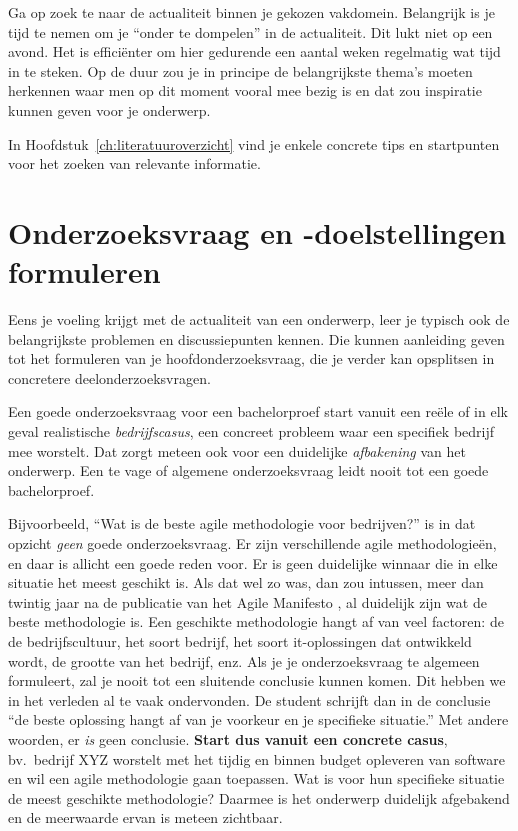 Ga op zoek te naar de actualiteit binnen je gekozen vakdomein. Belangrijk is je tijd te nemen om je ``onder te dompelen'' in de actualiteit. Dit lukt niet op een avond. Het is efficiënter om hier gedurende een aantal weken regelmatig wat tijd in te steken. Op de duur zou je in principe de belangrijkste thema's moeten herkennen waar men op dit moment vooral mee bezig is en dat zou inspiratie kunnen geven voor je onderwerp.

In Hoofdstuk~\ref{ch:literatuuroverzicht} vind je enkele concrete tips en startpunten voor het zoeken van relevante informatie.

\section{Onderzoeksvraag en -doelstellingen formuleren}%
\label{sec:onderzoeksvraag_formuleren}

Eens je voeling krijgt met de actualiteit van een onderwerp, leer je typisch ook de belangrijkste problemen en discussiepunten kennen. Die kunnen aanleiding geven tot het formuleren van je hoofdonderzoeksvraag, die je verder kan opsplitsen in concretere deelonderzoeksvragen.

Een goede onderzoeksvraag voor een bachelorproef start vanuit een reële of in elk geval realistische \textit{bedrijfscasus}, een concreet probleem waar een specifiek bedrijf mee worstelt. Dat zorgt meteen ook voor een duidelijke \textit{afbakening} van het onderwerp. Een te vage of algemene onderzoeksvraag leidt nooit tot een goede bachelorproef.

Bijvoorbeeld, ``Wat is de beste agile methodologie voor bedrijven?'' is in dat opzicht \textit{geen} goede onderzoeksvraag. Er zijn verschillende agile methodologieën, en daar is allicht een goede reden voor. Er is geen duidelijke winnaar die in elke situatie het meest geschikt is. Als dat wel zo was, dan zou intussen, meer dan twintig jaar na de publicatie van het Agile Manifesto \autocite{Beck2001}, al duidelijk zijn wat de beste methodologie is. Een geschikte methodologie hangt af van veel factoren: de de bedrijfscultuur, het soort bedrijf, het soort it-oplossingen dat ontwikkeld wordt, de grootte van het bedrijf, enz. Als je je onderzoeksvraag te algemeen formuleert, zal je nooit tot een sluitende conclusie kunnen komen. Dit hebben we in het verleden al te vaak ondervonden. De student schrijft dan in de conclusie ``de beste oplossing hangt af van je voorkeur en je specifieke situatie.'' Met andere woorden, er \textit{is} geen conclusie. \textbf{Start dus vanuit een concrete casus}, bv.\ bedrijf XYZ worstelt met het tijdig en binnen budget opleveren van software en wil een agile methodologie gaan toepassen. Wat is voor hun specifieke situatie de meest geschikte methodologie? Daarmee is het onderwerp duidelijk afgebakend en de meerwaarde ervan is meteen zichtbaar.

